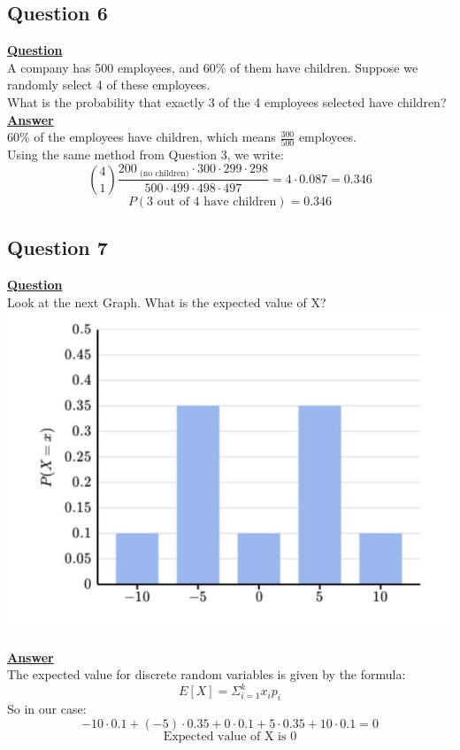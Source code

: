 \documentclass[a4, 12pt,titlepage]{scrartcl}
\begin{document}
\subsection{Question 6}
\textbf{\underline{Question}}\\
A company has 500 employees, and 60\% of them have children.
Suppose we randomly select 4 of these employees.\\
What is the probability that exactly 3 of the 4 employees selected have children?
\smallskip\\
\textbf{\underline{Answer}}\\
60\% of the employees have children, which means $\frac{300}{500}$ employees.\\
Using the same method from Question 3, we write:\[
\binom{4}{1}\frac{200_{\textrm{ (no children)}}\cdot 300 \cdot 299 \cdot 298}{500 \cdot 499 \cdot 498 \cdot 497}=4\cdot 0.087=0.346
\]
\[
\boxed{P(\textrm{3 out of 4 have children})=0.346}
\]
\newpage

\subsection{Question 7}
\textbf{\underline{Question}}\\
Look at the next Graph. What is the expected value of X?\\
\includegraphics{DSgraph2.jpg}\\
\smallskip\\
\textbf{\underline{Answer}}\\
The expected value for discrete random variables is given by the formula:\[
E[X]=\Sigma^{k}_{i=1}x_i p_i
\]
So in our case:\[
-10\cdot 0.1+(-5)\cdot0.35+ 0\cdot 0.1 +5 \cdot 0.35 +10\cdot 0.1=0
\]
\[
\boxed{\textrm{Expected value of X is 0}}
\]
\end{document}
